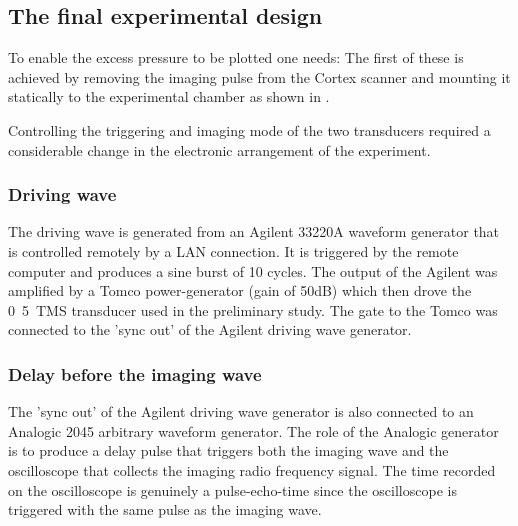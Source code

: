 

\subsection{The final experimental design} \label{sec:exp:finalDesign}

To enable the excess pressure to be plotted one needs:
The first of these is achieved by removing the imaging pulse from the Cortex scanner
and mounting it statically to the experimental chamber as shown in .

Controlling the triggering and imaging mode of the two transducers 
required a considerable change in the electronic arrangement of the experiment.




\subsubsection{Driving wave}
The driving wave is generated from an Agilent  33220A waveform generator
that is controlled remotely by a LAN connection.
It is triggered by the remote computer and produces  a sine burst of 10 cycles.
The output of the Agilent was amplified by a  Tomco power-generator (gain of \unit{50}dB)
which then drove the \unit{0.5}\mega\hertz\ TMS transducer used in the preliminary study.
The gate to the Tomco was connected to the 'sync out' of the Agilent driving wave generator.


\subsubsection{Delay before the imaging wave}
The 'sync out' of the Agilent driving wave generator is also connected to 
an Analogic 2045 arbitrary waveform generator.
The role of the Analogic generator is to produce 
a delay pulse that  triggers both the imaging wave
and  the oscilloscope that collects the imaging radio frequency signal.
The time recorded on the oscilloscope is genuinely a pulse-echo-time since the oscilloscope is triggered with the same pulse as the imaging wave.

